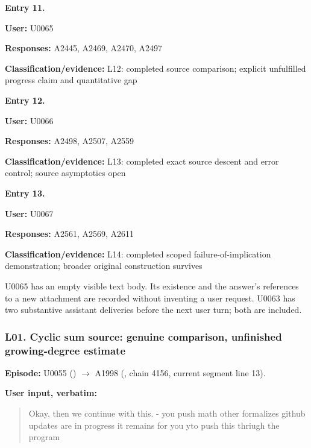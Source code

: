 
\textbf{Entry 11.}

\textbf{User:} U0065

\textbf{Responses:} A2445, A2469, A2470, A2497

\textbf{Classification/evidence:} L12: completed source comparison;
explicit unfulfilled progress claim and quantitative gap


\textbf{Entry 12.}

\textbf{User:} U0066

\textbf{Responses:} A2498, A2507, A2559

\textbf{Classification/evidence:} L13: completed exact source descent
and error control; source asymptotics open


\textbf{Entry 13.}

\textbf{User:} U0067

\textbf{Responses:} A2561, A2569, A2611

\textbf{Classification/evidence:} L14: completed scoped
failure-of-implication demonstration; broader original construction
survives

U0065 has an empty visible text body. Its existence and the answer's
references to a new attachment are recorded without inventing a user
request. U0063 has two substantive assistant deliveries before the next
user turn; both are included.

\subsubsection{L01. Cyclic sum source: genuine comparison, unfinished
growing-degree
estimate}\label{l01.-cyclic-sum-source-genuine-comparison-unfinished-growing-degree-estimate}

\textbf{Episode:} U0055
(\protect{})
\allowbreak{}\ensuremath{→}\allowbreak{} A1998
(\protect{}, chain 4156,
current segment line 13).

\textbf{User input, verbatim:}

\begin{quote}
Okay, then we continue with this. - you push math other formalizes
github updates are in progress it remains for you yto push this thriugh
the program
\end{quote}

